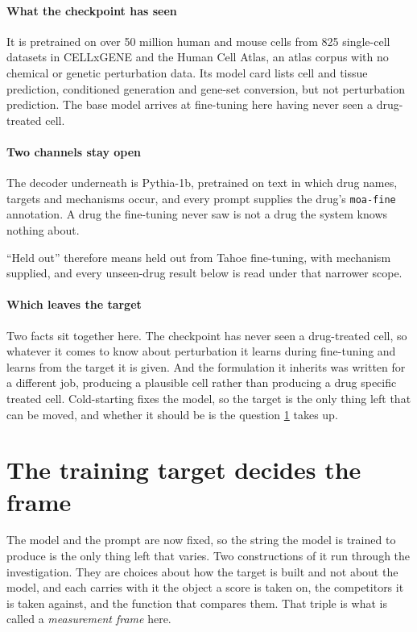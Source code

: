 \paragraph{What the checkpoint has seen} It is pretrained on over 50 million
human and mouse cells from 825 single-cell datasets in CELLxGENE and the Human
Cell Atlas, an atlas corpus with no chemical or genetic perturbation data. Its
model card lists cell and tissue prediction, conditioned generation and gene-set
conversion, but not perturbation prediction. The base model arrives at
fine-tuning here having never seen a drug-treated cell.

\paragraph{Two channels stay open} The decoder underneath is Pythia-1b,
pretrained on text in which drug names, targets and mechanisms occur, and every
prompt supplies the drug's \texttt{moa-fine} annotation. A drug the fine-tuning
never saw is not a drug the system knows nothing about.

\begin{scopelimit}
``Held out'' therefore means held out from Tahoe fine-tuning, with mechanism
supplied, and every unseen-drug result below is read under that narrower scope.
\end{scopelimit}

\paragraph{Which leaves the target} Two facts sit together here. The checkpoint
has never seen a drug-treated cell, so whatever it comes to know about
perturbation it learns during fine-tuning and learns from the target it is given.
And the formulation it inherits was written for a different job, producing a
plausible cell rather than producing a drug specific treated cell. Cold-starting
fixes the model, so the target is the only thing left that can be moved, and
whether it should be is the question \cref{sec:apparatus-vocab} takes up.

\section{The training target decides the frame}
\label{sec:apparatus-vocab}

The model and the prompt are now fixed, so the string the model is trained to
produce is the only thing left that varies. Two constructions of it run through
the investigation. They are choices about how the target is built and not about
the model, and each carries with it the object a score is taken on, the
competitors it is taken against, and the function that compares them. That triple
is what is called a \emph{measurement frame} here.

